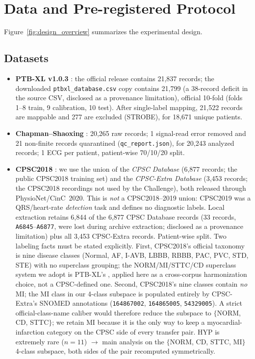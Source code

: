 \documentclass[review,12pt,nonatbib]{elsarticle}
\begin{document}
\section{Data and Pre-registered Protocol}
\label{sec:data}
Figure~\ref{fig:design_overview} summarizes the experimental design.
\subsection{Datasets}
\begin{itemize}
    \item \textbf{PTB-XL v1.0.3} \cite{wagner2020ptbxl}: the official release contains 21,837
    records; the downloaded \texttt{ptbxl\_database.csv} copy contains 21,799
    (a 38-record deficit in the source CSV, disclosed as a provenance
    limitation), official 10-fold
    (folds 1--8 train, 9 calibration, 10 test). After
    single-label mapping, 21,522 records are mappable and 277 are
    excluded (STROBE), for 18,671 unique patients.
    \item \textbf{Chapman--Shaoxing} \cite{zheng2022ecgarrhythmia,goldberger2000}: 20,265
    raw records; 1 signal-read error removed and 21 non-finite records
    quarantined (\texttt{qc\_report.json}), for 20,243 analyzed records;
    1 ECG per patient, patient-wise 70/10/20 split.
    \item \textbf{CPSC2018} \cite{liu2018cpsc,physionet2020cpsc}: we use the union
    of the \emph{CPSC Database} (6,877 records; the public CPSC2018 training
    set) and the \emph{CPSC-Extra Database} (3,453 records; the CPSC2018
    recordings not used by the Challenge), both released through
    PhysioNet/CinC~2020. This is \emph{not} a CPSC2018--2019 union: CPSC2019
    was a QRS/heart-rate \emph{detection} task and defines no diagnostic
    labels. Local extraction retains 6,844 of the 6,877 CPSC Database records
    (33 records, \texttt{A6845}--\texttt{A6877}, were lost during archive
    extraction; disclosed as a provenance limitation) plus all 3,453
    CPSC-Extra records. Patient-wise split. Two labeling facts must be stated
    explicitly. First, CPSC2018's official taxonomy is nine disease classes
    (Normal, AF, I-AVB, LBBB, RBBB, PAC, PVC, STD, STE) with no superclass
    grouping; the NORM\slash MI\slash STTC\slash CD superclass system we adopt
    is PTB-XL's \cite{wagner2020ptbxl}, applied here as a cross-corpus
    harmonization choice, not a CPSC-defined one. Second, CPSC2018's nine
    classes contain \emph{no} MI; the MI class in our 4-class subspace is
    populated entirely by CPSC-Extra's SNOMED annotations (\texttt{164867002},
    \texttt{164865005}, \texttt{54329005}). A strict official-class-name
    caliber would therefore reduce the subspace to $\{$NORM, CD, STTC$\}$; we
    retain MI because it is the only way to keep a myocardial-infarction
    category on the CPSC side of every transfer pair. HYP is extremely rare
    ($n=11$) $\rightarrow$ main analysis on the $\{$NORM, CD, STTC, MI$\}$
    4-class subspace, both sides of the pair recomputed symmetrically.
\end{itemize}
\end{document}
